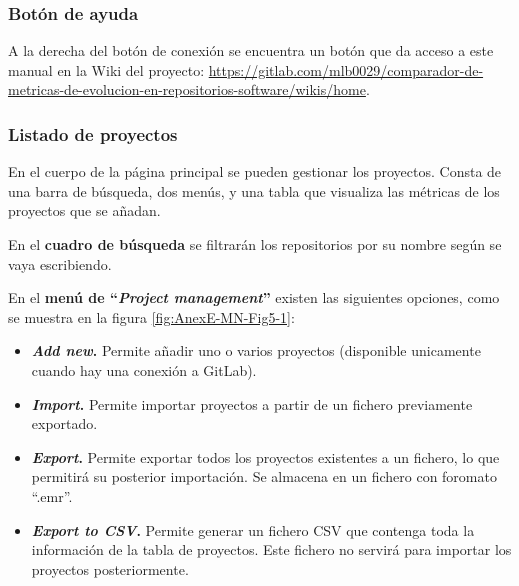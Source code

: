 \subsubsection{Botón de ayuda}
A la derecha del botón de conexión se encuentra un botón que da acceso a este manual en la Wiki del proyecto: \url{https://gitlab.com/mlb0029/comparador-de-metricas-de-evolucion-en-repositorios-software/wikis/home}.
\subsubsection{Listado de proyectos}
En el cuerpo de la página principal se pueden gestionar los proyectos. Consta de una barra de búsqueda, dos menús, y una tabla que visualiza las métricas de los proyectos que se añadan.

En el \textbf{cuadro de búsqueda} se filtrarán los repositorios por su nombre según se vaya escribiendo.

En el \textbf{menú de ``\textit{Project management}''} existen las siguientes opciones, como se muestra en la figura \ref{fig:AnexE-MN-Fig5-1}:
\begin{itemize}
	\item \textbf{\textit{Add new}.} Permite añadir uno o varios proyectos (disponible unicamente cuando hay una conexión a GitLab). 
	
	\item \textbf{\textit{Import}.} Permite importar proyectos a partir de un fichero previamente exportado.
	
	\item \textbf{\textit{Export}.} Permite exportar todos los proyectos existentes a un fichero, lo que permitirá su posterior importación. Se almacena en un fichero con foromato ``.emr''.
	
	\item \textbf{\textit{Export to CSV}.} Permite generar un fichero CSV que contenga toda la información de la tabla de proyectos. Este fichero no servirá para importar los proyectos posteriormente.
\end{itemize}

